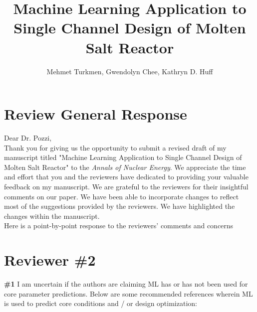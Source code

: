 \documentclass{ar2rc}
\begin{document}
\title{Machine Learning Application to Single Channel Design of Molten Salt
    Reactor}
\author{Mehmet Turkmen, Gwendolyn Chee, Kathryn D. Huff\medskip}

    \maketitle

    \section*{Review General Response}
    Dear Dr. Pozzi,
    \medskip
    \\
    Thank you for giving us the opportunity to submit a revised draft of my
    manuscript titled "Machine Learning Application to Single Channel Design of
    Molten Salt Reactor" to the \textit{Annals of Nuclear Energy}. We appreciate
    the time and effort that you and the reviewers have dedicated to providing
    your
    valuable feedback on my manuscript. We are grateful to the reviewers for
    their insightful comments on our paper. We have been able to incorporate
    changes to reflect most of the suggestions provided by the reviewers. We
    have
    highlighted the changes within the manuscript.
    \medskip
    \\
    Here is a point-by-point response to the reviewers’ comments and concerns

    \section*{Reviewer \#2}

    \Comment \textbf{\#1} I am uncertain if the authors are claiming ML has or has not been
             used for core parameter predictions.  Below are some recommended
             references wherein ML is used to predict core conditions and / or
             design optimization:
\end{document}
